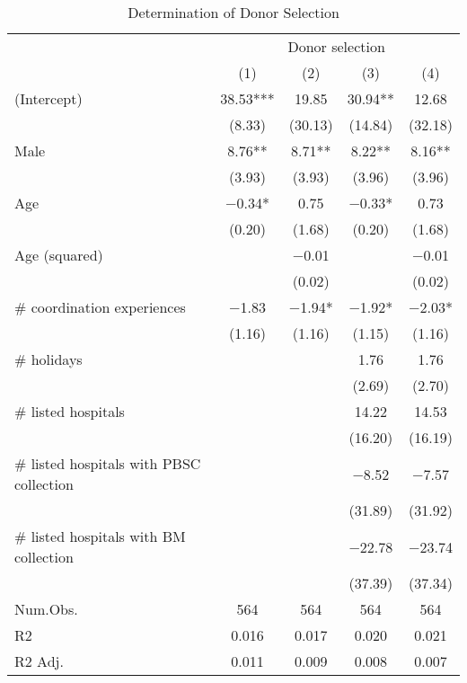 \documentclass[12pt, a4paper]{article}
\begin{document}
\begin{table}[H]

\caption{\label{tab:lm-who-selected}Determination of Donor Selection}
\centering
\fontsize{8}{10}\selectfont
\begin{threeparttable}
\begin{tabular}[t]{lcccc}
\toprule
\multicolumn{1}{c}{ } & \multicolumn{4}{c}{Donor selection} \\
\cmidrule(l{3pt}r{3pt}){2-5}
  & (1) & (2) & (3) & (4)\\
\midrule
(Intercept) & \num{38.53}*** & \num{19.85} & \num{30.94}** & \num{12.68}\\
 & (\num{8.33}) & (\num{30.13}) & (\num{14.84}) & (\num{32.18})\\
Male & \num{8.76}** & \num{8.71}** & \num{8.22}** & \num{8.16}**\\
 & (\num{3.93}) & (\num{3.93}) & (\num{3.96}) & (\num{3.96})\\
Age & \num{-0.34}* & \num{0.75} & \num{-0.33}* & \num{0.73}\\
 & (\num{0.20}) & (\num{1.68}) & (\num{0.20}) & (\num{1.68})\\
Age (squared) &  & \num{-0.01} &  & \num{-0.01}\\
 &  & (\num{0.02}) &  & (\num{0.02})\\
\# coordination experiences & \num{-1.83} & \num{-1.94}* & \num{-1.92}* & \num{-2.03}*\\
 & (\num{1.16}) & (\num{1.16}) & (\num{1.15}) & (\num{1.16})\\
\# holidays &  &  & \num{1.76} & \num{1.76}\\
 &  &  & (\num{2.69}) & (\num{2.70})\\
\# listed hospitals &  &  & \num{14.22} & \num{14.53}\\
 &  &  & (\num{16.20}) & (\num{16.19})\\
\# listed hospitals with PBSC collection &  &  & \num{-8.52} & \num{-7.57}\\
 &  &  & (\num{31.89}) & (\num{31.92})\\
\# listed hospitals with BM collection &  &  & \num{-22.78} & \num{-23.74}\\
 &  &  & (\num{37.39}) & (\num{37.34})\\
\midrule
Num.Obs. & \num{564} & \num{564} & \num{564} & \num{564}\\
R2 & \num{0.016} & \num{0.017} & \num{0.020} & \num{0.021}\\
R2 Adj. & \num{0.011} & \num{0.009} & \num{0.008} & \num{0.007}\\

\end{tabular}
\end{threeparttable}
\end{table}
\end{document}
